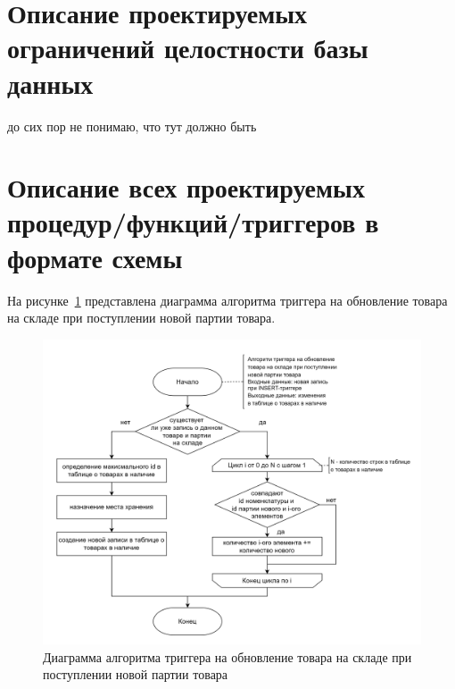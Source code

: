 \section{Описание проектируемых ограничений целостности базы данных}
до сих пор не понимаю, что тут должно быть
\section{Описание всех проектируемых процедур/функций/триггеров в формате схемы}
На рисунке~\ref{fig:trigger1} представлена диаграмма алгоритма триггера на обновление товара на складе при поступлении новой партии товара.
\begin{figure}
	\centering
	\includegraphics[width=1\linewidth]{pictures/trigger_1_load_batch}
	\caption{Диаграмма алгоритма триггера на обновление товара на складе при поступлении новой партии товара}
	\label{fig:trigger1}
\end{figure}

